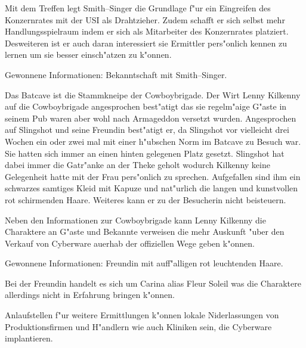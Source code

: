 Mit dem Treffen legt Smith--Singer die Grundlage f"ur ein Eingreifen des Konzernrates mit der USI als Drahtzieher. Zudem schafft er sich selbst mehr Handlungsspielraum indem er sich als Mitarbeiter des Konzernrates platziert. Desweiteren ist er auch daran interessiert sie Ermittler pers"onlich kennen zu lernen um sie besser einsch"atzen zu k"onnen.

\begin{remarks}
	Gewonnene Informationen: Bekanntschaft mit Smith--Singer.	
\end{remarks}


Das Batcave ist die Stammkneipe der Cowboybrigade. Der Wirt Lenny Kilkenny auf die Cowboybrigade angesprochen best"atigt das sie regelm"a\3ige G"aste in seinem Pub waren aber wohl nach Armageddon versetzt wurden. Angesprochen auf Slingshot und seine Freundin best"atigt er, da\3 Slingshot vor vielleicht drei Wochen ein oder zwei mal mit einer h"ubschen Norm im Batcave zu Besuch war. Sie hatten sich immer an einen hinten gelegenen Platz gesetzt. Slingshot hat dabei immer die Gatr"anke an der Theke geholt wodurch Kilkenny keine Gelegenheit hatte mit der Frau pers"onlich zu sprechen. Aufgefallen sind ihm ein schwarzes samtiges Kleid mit Kapuze und nat"urlich die langen und kunstvollen rot schirmenden Haare. Weiteres kann er zu der Besucherin nicht beisteuern.

Neben den Informationen zur Cowboybrigade kann Lenny Kilkenny die Charaktere an G"aste und Bekannte verweisen die mehr Auskunft "uber den Verkauf von Cyberware au\3erhab der offiziellen Wege geben k"onnen.

\begin{remarks}
	Gewonnene Informationen: Freundin mit auff"alligen rot leuchtenden Haare. 
	
	Bei der Freundin handelt es sich um Carina alias Fleur Soleil was die Charaktere allerdings nicht in Erfahrung bringen k"onnen.
\end{remarks}	


Anlaufstellen f"ur weitere Ermittlungen k"onnen lokale Niderlassungen von Produktionsfirmen und H"andlern wie auch Kliniken sein, die Cyberware implantieren.

